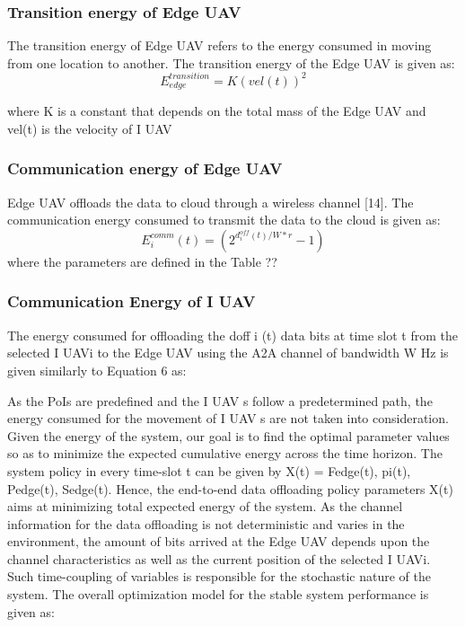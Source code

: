 \documentclass{article}
\begin{document}
\begin{multicols}{2}
\subsubsection{Transition energy of Edge UAV}
The transition energy of Edge UAV refers to the energy
consumed in moving from one location to another. The
transition energy of the Edge UAV is given as:
\begin{equation}
    E_{edge}^{transition}=K(vel(t))^2
\end{equation}

where K is a constant that depends on the total mass of
the Edge UAV and vel(t) is the velocity of I UAV 

\subsubsection{Communication energy of Edge UAV}
Edge UAV offloads the data to cloud through a wireless
channel [14]. The communication energy consumed
to transmit the data to the cloud is given as:
\begin{equation}
        E_i^{comm}(t)=(2^{d_i^{off}(t)/{W*r}}-1)
\end{equation}
where the parameters are defined in the Table ??

\subsubsection{Communication Energy of I UAV}
The energy consumed for offloading the doff
i (t) data bits
at time slot t from the selected I UAVi to the Edge UAV
using the A2A channel of bandwidth W Hz is given similarly
to Equation 6 as:
    
As the PoIs are predefined and the I UAV s follow a
predetermined path, the energy consumed for the movement
of I UAV s are not taken into consideration.
Given the energy of the system, our goal is to find
the optimal parameter values so as to minimize the expected
cumulative energy across the time horizon. The
system policy in every time-slot t can be given by X(t) =
{Fedge(t), pi(t), Pedge(t), Sedge(t)}. Hence, the end-to-end
data offloading policy parameters X(t) aims at minimizing
total expected energy of the system. As the channel
information for the data offloading is not deterministic
and varies in the environment, the amount of bits
arrived at the Edge UAV depends upon the channel characteristics
as well as the current position of the selected
I UAVi. Such time-coupling of variables is responsible for
the stochastic nature of the system. The overall optimization
model for the stable system performance is given as:



\end{multicols}
\end{document}

